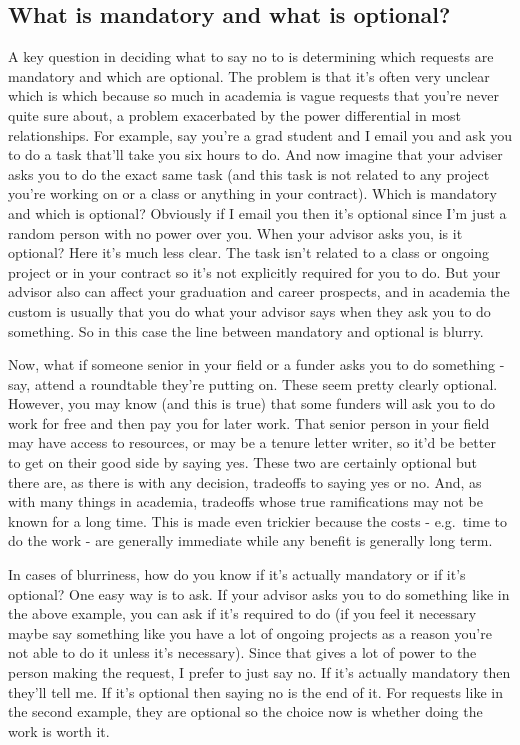 \documentclass[
  12pt,
  openany]{book}
\begin{document}
\hypertarget{what-is-mandatory-and-what-is-optional}{%
\subsection{What is mandatory and what is optional?}\label{what-is-mandatory-and-what-is-optional}}

A key question in deciding what to say no to is determining which requests are mandatory and which are optional. The problem is that it's often very unclear which is which because so much in academia is vague requests that you're never quite sure about, a problem exacerbated by the power differential in most relationships. For example, say you're a grad student and I email you and ask you to do a task that'll take you six hours to do. And now imagine that your adviser asks you to do the exact same task (and this task is not related to any project you're working on or a class or anything in your contract). Which is mandatory and which is optional? Obviously if I email you then it's optional since I'm just a random person with no power over you. When your advisor asks you, is it optional? Here it's much less clear. The task isn't related to a class or ongoing project or in your contract so it's not explicitly required for you to do. But your advisor also can affect your graduation and career prospects, and in academia the custom is usually that you do what your advisor says when they ask you to do something. So in this case the line between mandatory and optional is blurry.

Now, what if someone senior in your field or a funder asks you to do something - say, attend a roundtable they're putting on. These seem pretty clearly optional. However, you may know (and this is true) that some funders will ask you to do work for free and then pay you for later work. That senior person in your field may have access to resources, or may be a tenure letter writer, so it'd be better to get on their good side by saying yes. These two are certainly optional but there are, as there is with any decision, tradeoffs to saying yes or no. And, as with many things in academia, tradeoffs whose true ramifications may not be known for a long time. This is made even trickier because the costs - e.g.~time to do the work - are generally immediate while any benefit is generally long term.

In cases of blurriness, how do you know if it's actually mandatory or if it's optional? One easy way is to ask. If your advisor asks you to do something like in the above example, you can ask if it's required to do (if you feel it necessary maybe say something like you have a lot of ongoing projects as a reason you're not able to do it unless it's necessary). Since that gives a lot of power to the person making the request, I prefer to just say no. If it's actually mandatory then they'll tell me. If it's optional then saying no is the end of it. For requests like in the second example, they are optional so the choice now is whether doing the work is worth it.
\end{document}
